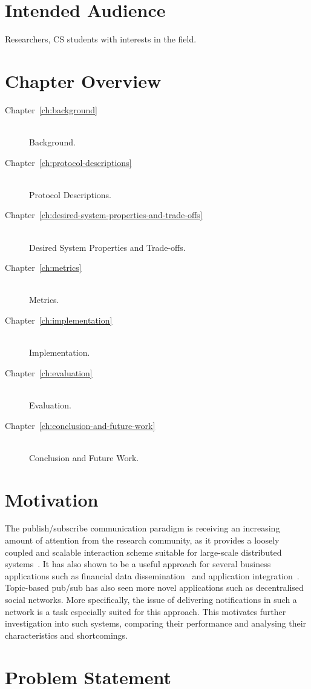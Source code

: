 \section{Intended Audience}
Researchers, CS students with interests in the field.

\section{Chapter Overview}

\begin{description}
    \item[Chapter~\ref{ch:background}] \hfill \\
        Background.
    \item[Chapter~\ref{ch:protocol-descriptions}] \hfill \\
        Protocol Descriptions.
    \item[Chapter~\ref{ch:desired-system-properties-and-trade-offs}] \hfill \\
        Desired System Properties and Trade-offs.
    \item[Chapter~\ref{ch:metrics}] \hfill \\
        Metrics.
    \item[Chapter~\ref{ch:implementation}] \hfill \\
        Implementation.
    \item[Chapter~\ref{ch:evaluation}] \hfill \\
        Evaluation.
    \item[Chapter~\ref{ch:conclusion-and-future-work}] \hfill \\
        Conclusion and Future Work.
\end{description}

\section{Motivation}

The publish/subscribe communication paradigm is receiving an increasing
amount of attention from the research community, as it provides a
loosely coupled and scalable interaction scheme suitable for large-scale
distributed systems~\cite{Eugster:2003}. It has also shown to be a useful
approach for several business applications such as financial data
dissemination~\cite{tibcorv} and application integration~\cite{goops}.
Topic-based pub/sub has also seen more novel applications such as
decentralised social networks. More specifically, the issue of
delivering notifications in such a network is a task especially suited
for this approach. This motivates further investigation into such
systems, comparing their performance and analysing their
characteristics and shortcomings.

\section{Problem Statement}

